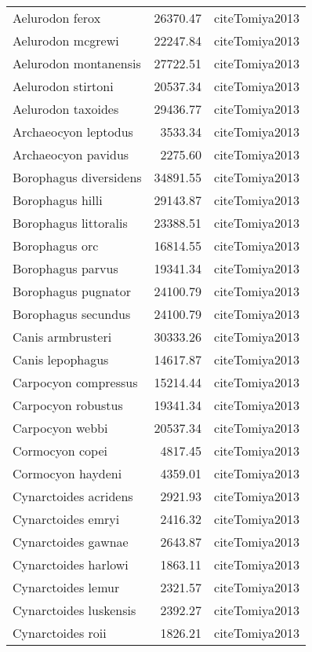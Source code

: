 \begin{table}[ht]
\begin{tabular}{lrl}
  Aelurodon ferox & 26370.47 & cite{Tomiya2013} \\ 
  Aelurodon mcgrewi & 22247.84 & cite{Tomiya2013} \\ 
  Aelurodon montanensis & 27722.51 & cite{Tomiya2013} \\ 
  Aelurodon stirtoni & 20537.34 & cite{Tomiya2013} \\ 
  Aelurodon taxoides & 29436.77 & cite{Tomiya2013} \\ 
  Archaeocyon leptodus & 3533.34 & cite{Tomiya2013} \\ 
  Archaeocyon pavidus & 2275.60 & cite{Tomiya2013} \\ 
  Borophagus diversidens & 34891.55 & cite{Tomiya2013} \\ 
  Borophagus hilli & 29143.87 & cite{Tomiya2013} \\ 
  Borophagus littoralis & 23388.51 & cite{Tomiya2013} \\ 
  Borophagus orc & 16814.55 & cite{Tomiya2013} \\ 
  Borophagus parvus & 19341.34 & cite{Tomiya2013} \\ 
  Borophagus pugnator & 24100.79 & cite{Tomiya2013} \\ 
  Borophagus secundus & 24100.79 & cite{Tomiya2013} \\ 
  Canis armbrusteri & 30333.26 & cite{Tomiya2013} \\ 
  Canis lepophagus & 14617.87 & cite{Tomiya2013} \\ 
  Carpocyon compressus & 15214.44 & cite{Tomiya2013} \\ 
  Carpocyon robustus & 19341.34 & cite{Tomiya2013} \\ 
  Carpocyon webbi & 20537.34 & cite{Tomiya2013} \\ 
  Cormocyon copei & 4817.45 & cite{Tomiya2013} \\ 
  Cormocyon haydeni & 4359.01 & cite{Tomiya2013} \\ 
  Cynarctoides acridens & 2921.93 & cite{Tomiya2013} \\ 
  Cynarctoides emryi & 2416.32 & cite{Tomiya2013} \\ 
  Cynarctoides gawnae & 2643.87 & cite{Tomiya2013} \\ 
  Cynarctoides harlowi & 1863.11 & cite{Tomiya2013} \\ 
  Cynarctoides lemur & 2321.57 & cite{Tomiya2013} \\ 
  Cynarctoides luskensis & 2392.27 & cite{Tomiya2013} \\ 
  Cynarctoides roii & 1826.21 & cite{Tomiya2013} \\ 

\end{tabular}
\end{table}

